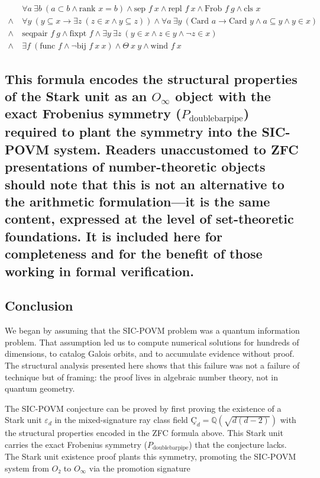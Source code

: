 \documentclass[12pt,a4paper]{article}
\begin{document}
\[
\begin{aligned}
&\forall a\ \exists b\ (a \subset b \land \text{rank } x = b) \land \text{sep } f \ x \land \text{repl } f \ x \land \text{Frob } f \ g \land \text{cls } x \\
\land\ &\forall y\ (y \subseteq x \rightarrow \exists z\ (z \in x \land y \subseteq z)) \land \forall a\ \exists y\ (\text{Card } a \rightarrow \text{Card } y \land a \subseteq y \land y \in x) \\
\land\ &\text{seqpair } f \ g \land \text{fixpt } f \land \exists y\ \exists z\ (y \in x \land z \in y \land \lnot z \in x) \\
\land\ &\exists f\ (\text{func } f \land \lnot \text{bij } f \ x \ x) \land \Theta \ x \ y \land \text{wind } f \ x
\end{aligned}
\]

\subsection{This formula encodes the structural properties of the Stark unit as an $O_{\infty}$ object with the exact Frobenius symmetry ($P_{\text{doublebarpipe}}$) required to plant the symmetry into the SIC-POVM system. Readers unaccustomed to ZFC presentations of number-theoretic objects should note that this is not an alternative to the arithmetic formulation---it is the same content, expressed at the level of set-theoretic foundations. It is included here for completeness and for the benefit of those working in formal verification.}

\subsection{Conclusion}

We began by assuming that the SIC-POVM problem was a quantum information problem. That assumption led us to compute numerical solutions for hundreds of dimensions, to catalog Galois orbits, and to accumulate evidence without proof. The structural analysis presented here shows that this failure was not a failure of technique but of framing: the proof lives in algebraic number theory, not in quantum geometry.

The SIC-POVM conjecture can be proved by first proving the existence of a Stark unit $\varepsilon_d$ in the mixed-signature ray class field $Ç_d = \mathbb{Q}(\sqrt{d(d-2)})$ with the structural properties encoded in the ZFC formula above. This Stark unit carries the exact Frobenius symmetry ($P_{\text{doublebarpipe}}$) that the conjecture lacks. The Stark unit existence proof plants this symmetry, promoting the SIC-POVM system from $O₂$ to $O_{\infty}$ via the promotion signature
\end{document}
